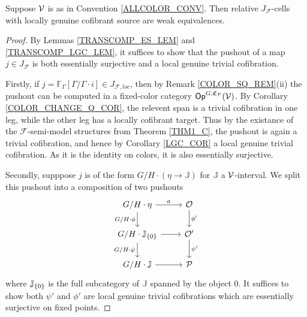 \documentclass[a4paper,10pt
,draft
]{article}%
\renewcommand{\F}{\mathcal F}
\newcommand{\J}{\mathbb J}
\renewcommand{\1}{\eta}%
\begin{document}
\begin{proposition}
      \label{J-CELL_PROP}
      Suppose $\mathcal V$ is as in Convention \ref{ALLCOLOR_CONV}. %
      Then relative $J_{\F}$-cells with locally genuine cofibrant source are weak equivalences.
\end{proposition}
\begin{proof}
      By Lemmas \ref{TRANSCOMP_ES_LEM} and \ref{TRANSCOMP_LGC_LEM}, it suffices to show that
      the pushout of a map $j \in J_\F$ is both
      essentially surjective and a local genuine trivial cofibration.

      Firstly, if $j = \mathbb F_\Gamma[\Gamma/\Gamma \cdot i] \in J_{\F, loc}$,
      then by Remark \ref{COLOR_SQ_REM}(ii) the pushout can be computed in a fixed-color category $\mathsf{Op}^{G,\mathfrak C_{\mathcal{P}}}(\mathcal V)$.
      By Corollary \ref{COLOR_CHANGE_Q_COR}, the relevent span is a trivial cofibration in one leg, while the other leg has a locally cofibrant target.
      Thus by the existance of the $\F$-semi-model structures from Theorem \ref{THM1_C},
      the pushout is again a trivial cofibration, and hence by Corollary \ref{LGC_COR} a local genuine trivial cofibration.
      As it is the identity on colors, it is also essentially surjective.

      Secondly, supppose $j$ is of the form $G/H \cdot (\1 \to \J)$ for $\J$ a $\mathcal V$-interval.
      We split this pushout into a composition of two pushouts
      \begin{equation}
            \begin{tikzcd}
                  G/H \cdot \1 \arrow[r, "a"] \arrow[d, "G/H \cdot \phi"']
                  &
                  \O \arrow[d,"\phi'"]
                  \\
                  G/H \cdot \J_{\set{0}} \arrow[r] \arrow[d, "G/H \cdot \psi"']
                  &
                  \O' \arrow[d,"\psi'"]
                  \\
                  G/H \cdot \J \arrow[r]
                  &
                  \P
            \end{tikzcd}
      \end{equation}
      where $\J_{\set{0}}$ is the full subcategory of $\J$ spanned by the object $0$.
      It suffices to show both $\psi'$ and $\phi'$ are local genuine trivial cofibrations which are essentially surjective on fixed points. 


\end{proof}
\end{document}

